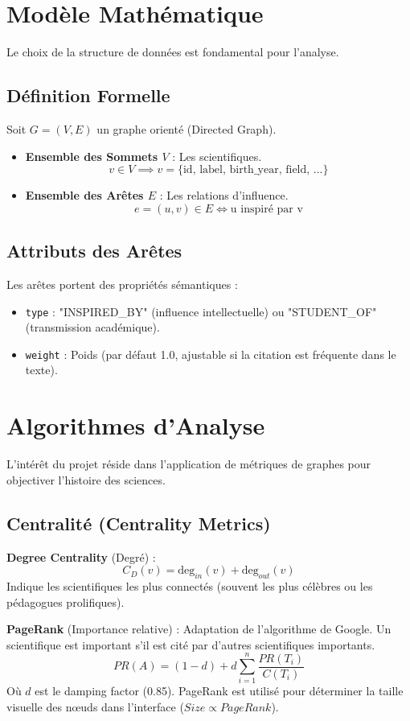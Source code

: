 \documentclass[12pt,a4paper]{report}
\begin{document}
\section{Modèle Mathématique}
Le choix de la structure de données est fondamental pour l'analyse.

\subsection{Définition Formelle}
Soit $G = (V, E)$ un graphe orienté (Directed Graph).
\begin{itemize}
    \item \textbf{Ensemble des Sommets $V$} : Les scientifiques. 
    $$v \in V \implies v = \{ \text{id, label, birth\_year, field, ...} \}$$
    \item \textbf{Ensemble des Arêtes $E$} : Les relations d'influence. 
    $$e = (u, v) \in E \iff \text{u inspiré par v}$$
\end{itemize}

\subsection{Attributs des Arêtes}
Les arêtes portent des propriétés sémantiques :
\begin{itemize}
    \item \texttt{type} : "INSPIRED\_BY" (influence intellectuelle) ou "STUDENT\_OF" (transmission académique).
    \item \texttt{weight} : Poids (par défaut 1.0, ajustable si la citation est fréquente dans le texte).
\end{itemize}

\section{Algorithmes d'Analyse}
L'intérêt du projet réside dans l'application de métriques de graphes pour objectiver l'histoire des sciences.

\subsection{Centralité (Centrality Metrics)}
\textbf{Degree Centrality} (Degré) :
$$C_D(v) = \text{deg}_{in}(v) + \text{deg}_{out}(v)$$
Indique les scientifiques les plus connectés (souvent les plus célèbres ou les pédagogues prolifiques).

\textbf{PageRank} (Importance relative) :
Adaptation de l'algorithme de Google. Un scientifique est important s'il est cité par d'autres scientifiques importants.
$$PR(A) = (1-d) + d \sum_{i=1}^{n} \frac{PR(T_i)}{C(T_i)}$$
Où $d$ est le damping factor (0.85). PageRank est utilisé pour déterminer la taille visuelle des nœuds dans l'interface ($Size \propto PageRank$).
\end{document}
